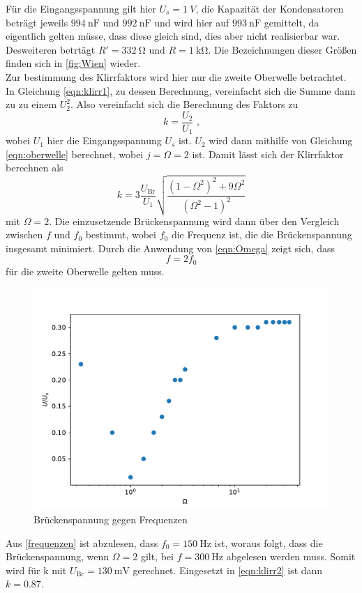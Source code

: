 Für die Eingangsspannung gilt hier $U_s=\qty{1}{V}$, die Kapazität der Kondensatoren beträgt jeweils $\qty{994}{\nano\farad}
\text{ und } \qty{992}{\nano\farad}$ und wird hier auf $\qty{993}{\nano\farad}$ gemittelt, da eigentlich gelten müsse, dass 
diese gleich sind, dies aber nicht realisierbar war. Desweiteren betrtägt $R'=\qty{332}{\ohm} \text{ und } R=\qty{1}{\kilo\ohm}$.
Die Bezeichnungen dieser Größen finden sich in \ref{fig:Wien} wieder.\\
Zur bestimmung des Klirrfaktors wird hier nur die zweite Oberwelle betrachtet. In Gleichung \ref{eqn:klirr1}, zu dessen Berechnung, vereinfacht
sich die Summe dann zu zu einem $U_2^2$. Also vereinfacht sich die Berechnung des Faktors zu 
\begin{equation}
    k=\frac{U_2}{U_1} \text{ ,}
\end{equation}
wobei $U_1$ hier die Eingangsspannung $U_s$ ist. $U_2$ wird dann mithilfe von Gleichung \ref{eqn:oberwelle} berechnet, wobei $j=\Omega=2$ ist.
Damit lässt sich der Klirrfaktor berechnen als
\begin{equation}
    k=3 \frac{U_\text{Br}}{U_1} \sqrt{\frac{(1-\Omega^2)^2+9\Omega^2}{(\Omega^2-1)^2}}
    \label{eqn:klirr2}
\end{equation}
mit $\Omega=2$. Die einzusetzende Brückenspannung wird dann über den Vergleich zwischen $ f $ und $f_0$ bestimmt, wobei $f_0$
die Frequenz ist, die die Brückenspannung insgesamt minimiert. Durch die Anwendung von \ref{eqn:Omega} zeigt sich, dass 
\begin{equation}
    f=2f_0
\end{equation}
für die zweite Oberwelle gelten muss. 

\begin{figure}
    \centering
    \includegraphics{ ./frequenzplot.pdf}
    \caption{Brückenspannung gegen Frequenzen}
    \label{fig:frequenzverhältnis}
\end{figure}

\noindent Aus \ref{frequenzen} ist abzulesen, dass $f_0=\qty{150}{\hertz}$ ist, woraus folgt,
dass die Brückenspannung, wenn $\Omega=2$ gilt, bei $f=\qty{300}{\hertz}$ abgelesen werden muss. Somit wird für k mit
$U_\text{Br}=\qty{130}{\milli\volt}$ gerechnet. Eingesetzt in \ref{eqn:klirr2} ist dann $k=0.87$.

